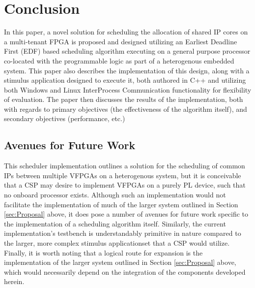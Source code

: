 
\section{Conclusion}\label{sec:conclusion}
In this paper, a novel solution for scheduling the allocation of shared IP cores on a multi-tenant FPGA is proposed and designed utilizing an Earliest Deadline First (EDF) based scheduling algorithm executing on a general purpose processor co-located with the programmable logic as part of a heterogenous embedded system. This paper also describes the implementation of this design, along with a stimulus application designed to execute it, both authored in C++ and utilizing both Windows and Linux InterProcess Communication functionality for flexibility of evaluation. The paper then discusses the results of the implementation, both with regards to primary objectives (the effectiveness of the algorithm itself), and secondary objectives (performance, etc.)

\subsection{Avenues for Future Work}\label{subsec:future}
This scheduler implementation outlines a solution for the scheduling of common IPs between multiple VFPGAs on a heterogenous system, but it is conceivable that a CSP may desire to implement VFPGAs on a purely PL device, such that no onboard processor exists. Although such an implementation would not facilitate the implementation of much of the larger system outlined in Section \ref{sec:Proposal} above, it does pose a number of avenues for future work specific to the implementation of a scheduling algorithm itself. Similarly, the current implementation's testbench is understandably primitive in nature compared to the larger, more complex stimulus applicationset that a CSP would utilize. Finally, it is worth noting that a logical route for expansion is the implementation of the larger system outlined in Section \ref{sec:Proposal} above, which would necessarily depend on the integration of the components developed herein.